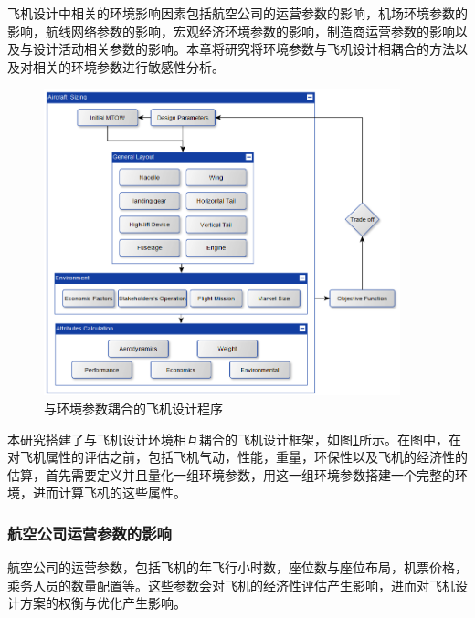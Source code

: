 \documentclass[12pt,a4paper]{report}
\begin{document}
飞机设计中相关的环境影响因素包括航空公司的运营参数的影响，机场环境参数的影响，航线网络参数的影响，宏观经济环境参数的影响，制造商运营参数的影响以及与设计活动相关参数的影响。本章将研究将环境参数与飞机设计相耦合的方法以及对相关的环境参数进行敏感性分析。


\begin{figure}[ht!]
	\centering
	\includegraphics[width=4.06in,height=3.5in]{./media511/image1.png}
	\caption{与环境参数耦合的飞机设计程序}
	\label{fig:scenario}
\end{figure}

本研究搭建了与飞机设计环境相互耦合的飞机设计框架，如图\ref{fig:scenario}所示。在图中，在对飞机属性的评估之前，包括飞机气动，性能，重量，环保性以及飞机的经济性的估算，首先需要定义并且量化一组环境参数，用这一组环境参数搭建一个完整的环境，进而计算飞机的这些属性。

\subsubsection{航空公司运营参数的影响}
航空公司的运营参数，包括飞机的年飞行小时数，座位数与座位布局，机票价格，乘务人员的数量配置等。这些参数会对飞机的经济性评估产生影响，进而对飞机设计方案的权衡与优化产生影响。
\end{document}
